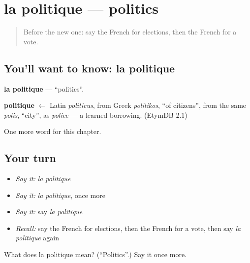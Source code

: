 \section[la politique]{la politique — politics}

\label{lesson:FR-C248-politique}



\begin{quote}
Before the new one: say the French for elections, then the French for a vote.
\end{quote}

\subsection*{You'll want to know: la politique}
\textbf{la politique} — \textquotedblleft{}politics\textquotedblright{}.

\begin{cousinweb}
\textbf{politique} $\leftarrow$ Latin \emph{politicus}, from Greek \emph{politikos}, \textquotedblleft{}of citizens\textquotedblright{}, from the same \emph{polis}, \textquotedblleft{}city\textquotedblright{}, as \emph{police} — a learned borrowing. (EtymDB 2.1)
\end{cousinweb}

\begin{grammarlens}[title={What you've built}]
One more word for this chapter.
\end{grammarlens}

\subsection*{Your turn}
\begin{itemize}
\raggedright
  \item \emph{Say it:} \emph{la politique}
  \item \emph{Say it:} \emph{la politique}, once more
  \item \emph{Say it:} say \emph{la politique}
  \item \emph{Recall:} say the French for elections, then the French for a vote, then say \emph{la politique} again
\end{itemize}

\begin{tcolorbox}[breakable,colback=teal!4,colframe=teal!35!black,title={Before you move on}]
What does la politique mean? (\textquotedblleft{}Politics\textquotedblright{}.) Say it once more.
\end{tcolorbox}
